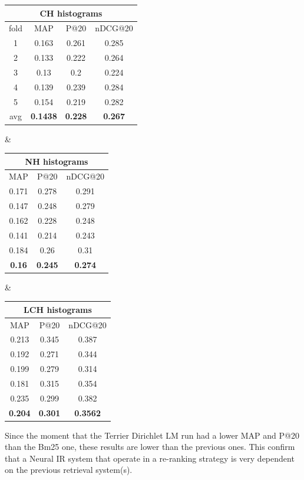 \begin{adjustbox}{center, tabular=ccc, caption={DRMM runs, 100-100 pos/neg IDF weighting, stemmed with stopwords removal, run to re-rank generated with ``DiricheletLM'' algorithm}, nofloat=table}
\centering
\begin{tabular}{c|ccc}
\hline
\multicolumn{4}{c}{CH histograms} \\ \hline
fold & MAP & P@20 & nDCG@20 \\ \hline
1 & 0.163 & 0.261 & 0.285 \\
2 & 0.133 & 0.222 & 0.264 \\
3 & 0.13 & 0.2 & 0.224 \\
4 & 0.139 & 0.239 & 0.284 \\
5 & 0.154 & 0.219 & 0.282 \\ \hline
avg & \textbf{0.1438} & \textbf{0.228} & \textbf{0.267} \\
\hline
\end{tabular} &
\begin{tabular}{ccc}
\hline
\multicolumn{3}{c}{NH histograms} \\ \hline
MAP & P@20 & nDCG@20 \\ \hline
0.171 & 0.278 & 0.291 \\
0.147 & 0.248 & 0.279 \\
0.162 & 0.228 & 0.248 \\
0.141 & 0.214 & 0.243 \\
0.184 & 0.26 & 0.31 \\ \hline
\textbf{0.16} & \textbf{0.245} & \textbf{0.274} \\
\hline
\end{tabular} &
\begin{tabular}{ccc}
\hline
\multicolumn{3}{c}{LCH histograms} \\ \hline
MAP & P@20 & nDCG@20 \\ \hline
0.213 & 0.345 & 0.387 \\
0.192 & 0.271 & 0.344 \\
0.199 & 0.279 & 0.314 \\
0.181 & 0.315 & 0.354 \\
0.235 & 0.299 & 0.382 \\ \hline
\textbf{0.204} & \textbf{0.301} & \textbf{0.3562} \\
\hline
\end{tabular}
\end{adjustbox}

Since the moment that the Terrier Dirichlet LM run had a lower MAP and P@20 than the Bm25 one, these results are lower than the previous ones. This confirm that a Neural IR system that operate in a re-ranking strategy is very dependent on the previous retrieval system(s).

